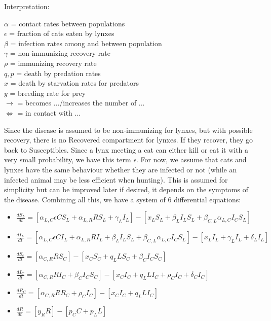 \documentclass{article}
\begin{document}
Interpretation:
\begin{multicols}{2}
    $\alpha$ = contact rates between populations\\
    $\epsilon$ = fraction of cats eaten by lynxes\\
    $\beta$ = infection rates among and between population\\
    $\gamma$ = non-immunizing recovery rate \\
    $\rho$ = immunizing recovery rate\\
    $q, p$ = death by predation rates\\
    $x$ = death by starvation rates for predators\\
    $y$ = breeding rate for prey\\
    $\rightarrow$ = becomes .../increases the number of ...\\
    $\Leftrightarrow$ = in contact with ...
\end{multicols}
\quad Since the disease is assumed to be non-immunizing for lynxes, but with possible recovery, there is no Recovered compartment for lynxes. If they recover, they go back to Susceptibles. Since a lynx meeting a cat can either kill or eat it with a very small probability, we have this term $\epsilon$. For now, we assume that cats and lynxes have the same behaviour whether they are infected or not (while an infected animal may be less efficient when hunting). This is assumed for simplicity but can be improved later if desired, it depends on the symptoms of the disease. Combining all this, we have a system of 6 differential equations:
\begin{itemize}
	\item $\frac{dS_{L}}{dt} = [\alpha_{L,C}\epsilon CS_{L} + \alpha_{L,R}RS_{L} + \gamma_{L}I_{L}] - [x_{L}S_{L} + \beta_{L}I_{L}S_{L} + \beta_{C,L}\alpha_{L,C}I_{C}S_{L}]$
	\item $\frac{dI_{L}}{dt} = [\alpha_{L,C}\epsilon CI_{L} + \alpha_{L,R}RI_{L} + \beta_{L}I_{L}S_{L} + \beta_{C,L}\alpha_{L,C}I_{C}S_{L}] - [x_{L}I_{L} + \gamma_{L}I_{L} + \delta_{L}I_{L}]$
	\item $\frac{dS_{c}}{dt} = [\alpha_{C,R}RS_{C}] - [x_{C}S_{C} + q_{L} LS_{C} + \beta_{C}I_{C}S_{C}]$
	\item $\frac{dI_{C}}{dt} = [\alpha_{C,R}RI_{C} + \beta_{C}I_{C}S_{C}] - [x_{C}I_{C} + q_{L} LI_{C} + \rho_{C}I_{C} + \delta_{C}I_{C}]$
	\item $\frac{dR_{C}}{dt} = [\alpha_{C,R}RR_{C} + \rho_{C}I_{C}] - [x_{C}I_{C} + q_{L} LI_{C}]$
	\item $\frac{dR}{dt} = [y_{R}R] - [p_{C}C + p_{L}L]$
\end{itemize}	
\end{document}
